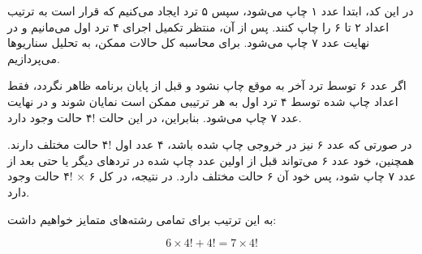 در این کد، ابتدا عدد ۱ چاپ می‌شود، سپس ۵ ترد ایجاد می‌کنیم که قرار است به ترتیب اعداد ۲ تا ۶ را چاپ کنند. پس از آن، منتظر تکمیل اجرای ۴ ترد اول می‌مانیم و در نهایت عدد ۷ چاپ می‌شود. برای محاسبه کل حالات ممکن، به تحلیل سناریوها می‌پردازیم.

اگر عدد ۶ توسط ترد آخر به موقع چاپ نشود و قبل از پایان برنامه ظاهر نگردد، فقط اعداد چاپ شده توسط ۴ ترد اول به هر ترتیبی ممکن است نمایان شوند و در نهایت عدد ۷ چاپ می‌شود. بنابراین، در این حالت !۴ حالت وجود دارد.

در صورتی که عدد ۶ نیز در خروجی چاپ شده باشد، ۴ عدد اول !۴ حالت مختلف دارند. همچنین، خود عدد ۶ می‌تواند قبل از اولین عدد چاپ شده در تردهای دیگر یا حتی بعد از عدد ۷ چاپ شود، پس خود آن ۶ حالت مختلف دارد. در نتیجه، در کل ۶ × !۴ حالت وجود دارد.

به این ترتیب برای تمامی رشته‌های متمایز خواهیم داشت:

\[
    6 \times 4! + 4! = 7 \times 4!  
\]